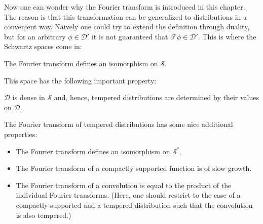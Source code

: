     Now one can wonder why the Fourier transform is introduced in this chapter. The reason is that this transformation can be generalized to distributions in a convenient way. Naively one could try to extend the definition through duality, but for an arbitrary $\phi\in\mathcal{D}'$ it is not guaranteed that $\mathcal{F}\phi\in\mathcal{D}'$. This is where the Schwartz spaces come in:
    \begin{property}
        The Fourier transform defines an isomorphism on $\mathscr{S}$.
    \end{property}

    This space has the following important property:
    \begin{property}
        $\mathcal{D}$ is dense in $\mathscr{S}$ and, hence, tempered distributions are determined by their values on $\mathcal{D}$.
    \end{property}

    \begin{property}
        The Fourier transform of tempered distributions has some nice additional properties:
        \begin{itemize}
            \item The Fourier transform defines an isomorphism on $\mathscr{S}^*$.
            \item The Fourier transform of a compactly supported function is of slow growth.
            \item The Fourier transform of a convolution is equal to the product of the individual Fourier transforms. (Here, one should restrict to the case of a compactly supported and a tempered distribution such that the convolution is also tempered.)
        \end{itemize}
    \end{property}

